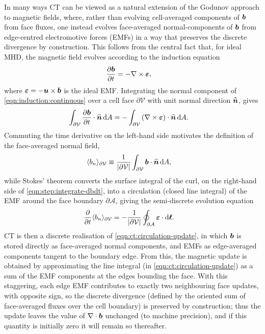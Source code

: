 In many ways CT can be viewed as a natural extension of the Godunov approach to magnetic fields, where, rather than evolving cell-averaged components of $\bm{b}$ from face fluxes, one instead evolves face-averaged normal-components of $\bm{b}$ from edge-centred electromotive forces (EMFs) in a way that preserves the discrete divergence by construction. This follows from the central fact that, for ideal MHD, the magnetic field evolves according to the induction equation
\begin{align}
    \frac{\partial \bm{b}}{\partial t}
        &= -\nabla\times\bm{\varepsilon}
    , \label{eqn:induction:continuous}
\end{align}
where $\bm{\varepsilon} = -\bm{u}\times\bm{b}$ is the ideal EMF. Integrating the normal component of \cref{eqn:induction:continuous} over a cell face $\partial\mathcal{V}$ with unit normal direction $\widehat{\bm{n}}$, gives
\begin{align}
    \int_{\partial\mathcal{V}} \frac{\partial \bm{b}}{\partial t}\cdot\widehat{\bm{n}}\, \mathrm{d} A
        &= -\int_{\partial\mathcal{V}}
            \left( \nabla\times\bm{\varepsilon} \right)
            \cdot\widehat{\bm{n}}\, \mathrm{d} A
    . \label{eqn:step:integrate-dbdt}
\end{align}
Commuting the time derivative on the left-hand side motivates the definition of the face-averaged normal field,
\begin{align}
    \langle{b_n}\rangle_{\partial\mathcal{V}}
        &\equiv \frac{1}{|\partial\mathcal{V}|}
            \int_{\partial\mathcal{V}}
            \bm{b}\cdot\widehat{\bm{n}}\, \mathrm{d} A
    ,
\end{align}
while Stokes' theorem converts the surface integral of the curl, on the right-hand side of \cref{eqn:step:integrate-dbdt}, into a circulation (\ie closed line integral) of the EMF around the face boundary $\partial\mathcal{A}$, giving the semi-discrete evolution equation
\begin{align}
    \frac{\partial}{\partial t}\langle{b_n}\rangle_{\partial\mathcal{V}}
        &= -\frac{1}{|\partial\mathcal{V}|}
            \oint_{\partial\mathcal{A}}
            \bm{\varepsilon}\cdot\mathrm{d}\bm{\ell}
    . \label{eqn:ct:circulation-update}
\end{align}
CT is then a discrete realisation of \cref{eqn:ct:circulation-update}, in which $\bm{b}$ is stored directly as face-averaged normal components, and EMFs as edge-averaged components tangent to the boundary edge. From this, the magnetic update is obtained by approximating the line integral (in \cref{eqn:ct:circulation-update}) as a sum of the EMF components at the edges bounding the face. With this staggering, each edge EMF contributes to exactly two neighbouring face updates, with opposite sign, so the discrete divergence (defined by the oriented sum of face-averaged fluxes over the cell boundary) is preserved by construction; thus the update leaves the value of $\nabla\cdot\bm{b}$ unchanged (to machine precision), and if this quantity is initially zero it will remain so thereafter.

